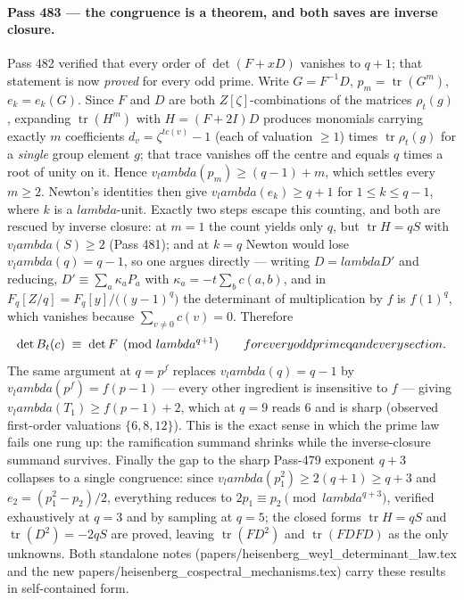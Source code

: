 \documentclass[12pt,a4paper]{article}
\def\mathbb#1{#1}%
\def\textbf#1{#1}%
\def\texttt#1{#1}%
\def\text#1{#1}%
\def\lambda{lambda}%
\theoremstyle{definition}
\newcommand{\FF}{\mathbb{F}}
\newcommand{\ZZ}{\mathbb{Z}}
\begin{document}
\paragraph{Pass 483 --- the congruence is a theorem, and both saves are
inverse closure.}
Pass 482 verified that every order of $\det(F+xD)$ vanishes to $q{+}1$; that
statement is now \emph{proved} for every odd prime.  Write $G=F^{-1}D$,
$p_m=\operatorname{tr}(G^m)$, $e_k=e_k(G)$.  Since $F$ and $D$ are both
$\ZZ[\zeta]$-combinations of the matrices $\rho_t(g)$, expanding
$\operatorname{tr}(H^m)$ with $H=(F{+}2I)D$ produces monomials carrying exactly
$m$ coefficients $d_v=\zeta^{tc(v)}{-}1$ (each of valuation $\ge1$) times
$\operatorname{tr}\rho_t(g)$ for a \emph{single} group element $g$; that trace
vanishes off the centre and equals $q$ times a root of unity on it.  Hence
$v_\lambda(p_m)\ge(q{-}1)+m$, which settles every $m\ge2$.  Newton's
identities then give $v_\lambda(e_k)\ge q{+}1$ for $1\le k\le q{-}1$, where $k$
is a $\lambda$-unit.  Exactly two steps escape this counting, and
\textbf{both are rescued by inverse closure}: at $m=1$ the count yields only
$q$, but $\operatorname{tr}H=qS$ with $v_\lambda(S)\ge2$ (Pass 481); and at
$k=q$ Newton would lose $v_\lambda(q)=q{-}1$, so one argues directly ---
writing $D=\lambda D'$ and reducing, $D'\equiv\sum_a\kappa_aP_a$ with
$\kappa_a=-t\sum_bc(a,b)$, and in
$\FF_q[\ZZ/q]=\FF_q[y]/\bigl((y{-}1)^q\bigr)$ the determinant of multiplication
by $f$ is $f(1)^q$, which vanishes because $\sum_{v\neq0}c(v)=0$.  Therefore
\[
\det B_t(c)\;\equiv\;\det F \pmod{\lambda^{q+1}}\qquad\text{for every odd prime
$q$ and every section.}
\]
The same argument at $q=p^f$ replaces $v_\lambda(q)=q{-}1$ by
$v_\lambda(p^f)=f(p{-}1)$ --- every other ingredient is insensitive to $f$ ---
giving $v_\lambda(T_1)\ge f(p{-}1)+2$, which at $q=9$ reads $6$ and is sharp
(observed first-order valuations $\{6,8,12\}$).  This is the exact sense in
which the prime law fails one rung up: the ramification summand shrinks while
the inverse-closure summand survives.  Finally the gap to the sharp Pass-479
exponent $q{+}3$ collapses to a single congruence: since
$v_\lambda(p_1^2)\ge2(q{+}1)\ge q{+}3$ and $e_2=(p_1^2-p_2)/2$, everything
reduces to $2p_1\equiv p_2 \pmod{\lambda^{q+3}}$, verified exhaustively at
$q=3$ and by sampling at $q=5$; the closed forms $\operatorname{tr}H=qS$ and
$\operatorname{tr}(D^2)=-2qS$ are proved, leaving $\operatorname{tr}(FD^2)$ and
$\operatorname{tr}(FDFD)$ as the only unknowns.  Both standalone notes
(\texttt{papers/heisenberg\_weyl\_determinant\_law.tex} and the new
\texttt{papers/heisenberg\_cospectral\_mechanisms.tex}) carry these results in
self-contained form.
\end{document}
